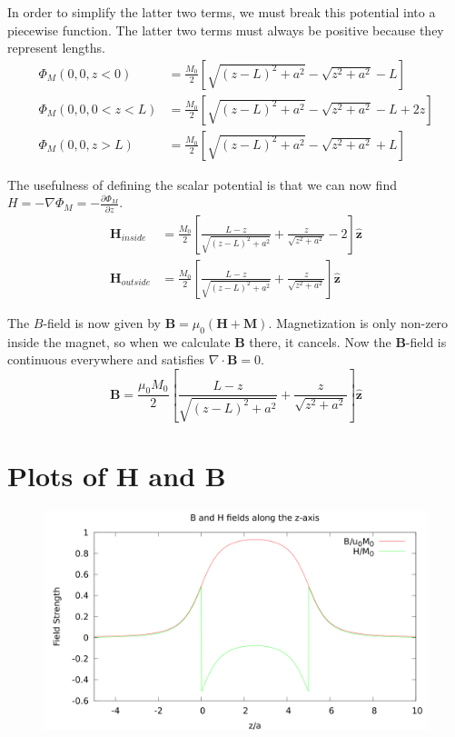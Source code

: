 \documentclass[10pt,a4paper]{article}
\begin{document}
In order to simplify the latter two terms, we must break this potential into a piecewise function.  The latter two terms must always be positive because they represent lengths.
\begin{align}
\Phi_M(0, 0, z<0)&=\frac{M_0}{2}\left[\sqrt{(z-L)^2+a^2}-\sqrt{z^2+a^2}-L\right] \\
\Phi_M(0, 0, 0<z<L)&=\frac{M_0}{2}\left[\sqrt{(z-L)^2+a^2}-\sqrt{z^2+a^2}-L+2z\right] \\
\Phi_M(0, 0, z>L)&=\frac{M_0}{2}\left[\sqrt{(z-L)^2+a^2}-\sqrt{z^2+a^2}+L\right]
\end{align}

The usefulness of defining the scalar potential is that we can now find $H=-\nabla\Phi_M=-\frac{\partial\Phi_M}{\partial z}$.
\begin{align}
\mathbf{H}_{inside}&=\frac{M_0}{2}\left[\frac{L-z}{\sqrt{(z-L)^2+a^2}}+\frac{z}{\sqrt{z^2+a^2}}-2\right]\mathbf{\hat{z}} \\
\mathbf{H}_{outside}&=\frac{M_0}{2}\left[\frac{L-z}{\sqrt{(z-L)^2+a^2}}+\frac{z}{\sqrt{z^2+a^2}}\right]\mathbf{\hat{z}}
\end{align}

The $B$-field is now given by $\mathbf{B}=\mu_0(\mathbf{H}+\mathbf{M})$.  Magnetization is only non-zero inside the magnet, so when we calculate $\mathbf{B}$ there, it cancels.  Now the $\mathbf{B}$-field is continuous everywhere and satisfies $\nabla \cdot \mathbf{B}=0$.
\begin{equation}
\mathbf{B}=\frac{\mu_0 M_0}{2}\left[\frac{L-z}{\sqrt{(z-L)^2+a^2}}+\frac{z}{\sqrt{z^2+a^2}}\right]\mathbf{\hat{z}}
\end{equation}

\section{Plots of \textbf{H} and \textbf{B}}
\begin{figure}[h]
\includegraphics[width=1\textwidth]{5-19-plot.png}
\end{figure}
\end{document}
